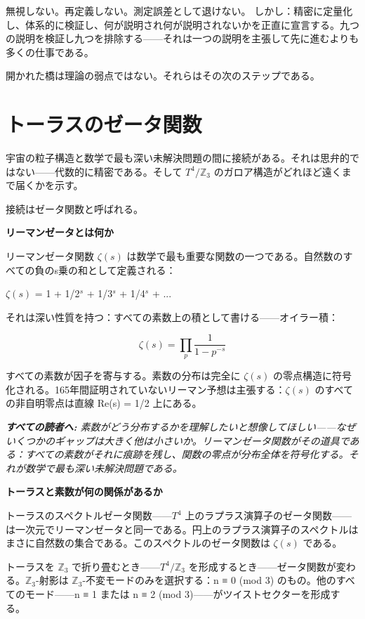 \documentclass[11pt,openany]{book}
\newenvironment{laierspur}{%
  \par\vspace{4pt}%
  \noindent\small\itshape\color{blue!60!black}%
  \textbf{すべての読者へ:}\enspace\ignorespaces}{%
  \par\vspace{4pt}\normalsize\normalfont\normalcolor}
\begin{document}
無視しない。再定義しない。測定誤差として退けない。
しかし：精密に定量化し、体系的に検証し、何が説明され何が説明されないかを正直に宣言する。九つの説明を検証し九つを排除する——それは一つの説明を主張して先に進むよりも多くの仕事である。

開かれた橋は理論の弱点ではない。それらはその次のステップである。

\medskip

\chapter{トーラスのゼータ関数}

宇宙の粒子構造と数学で最も深い未解決問題の間に接続がある。それは思弁的ではない——代数的に精密である。そして $T^4/\mathbb{Z}_3$ のガロア構造がどれほど遠くまで届くかを示す。

接続はゼータ関数と呼ばれる。

\textbf{リーマンゼータとは何か}

リーマンゼータ関数 $\zeta(s)$ は数学で最も重要な関数の一つである。自然数のすべての負のs乗の和として定義される：

$\zeta(s)$ = 1 + 1/2$^s$ + 1/3$^s$ + 1/4$^s$ + ...

それは深い性質を持つ：すべての素数上の積として書ける——オイラー積：

\[\zeta(s) = \prod_p \frac{1}{1-p^{-s}}\]

すべての素数が因子を寄与する。素数の分布は完全に $\zeta(s)$ の零点構造に符号化される。165年間証明されていないリーマン予想は主張する：$\zeta(s)$ のすべての非自明零点は直線 Re(s) = 1/2 上にある。

\begin{laierspur}
素数がどう分布するかを理解したいと想像してほしい——なぜいくつかのギャップは大きく他は小さいか。リーマンゼータ関数がその道具である：すべての素数がそれに痕跡を残し、関数の零点が分布全体を符号化する。それが数学で最も深い未解決問題である。
\end{laierspur}

\textbf{トーラスと素数が何の関係があるか}

トーラスのスペクトルゼータ関数——$T^4$ 上のラプラス演算子のゼータ関数——は一次元でリーマンゼータと同一である。円上のラプラス演算子のスペクトルはまさに自然数の集合である。このスペクトルのゼータ関数は $\zeta(s)$ である。

トーラスを $\mathbb{Z}_3$ で折り畳むとき——$T^4/\mathbb{Z}_3$ を形成するとき——ゼータ関数が変わる。$\mathbb{Z}_3$-射影は $\mathbb{Z}_3$-不変モードのみを選択する：n ≡ 0 (mod 3) のもの。他のすべてのモード——n ≡ 1 または n ≡ 2 (mod 3)——がツイストセクターを形成する。
\end{document}
